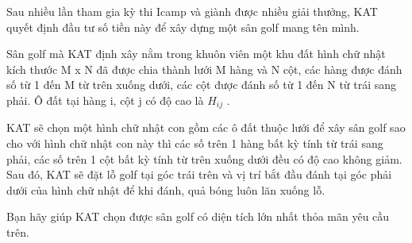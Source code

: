 Sau nhiều lần tham gia kỳ thi Icamp và giành được nhiều giải thưởng, KAT quyết định đầu tư số tiền này để xây dựng một sân golf mang tên mình.

Sân golf mà KAT định xây nằm trong khuôn viên một khu đất hình chữ nhật kích thước M x N đã được chia thành lưới M hàng và N cột, các hàng được đánh số từ 1 đến M từ trên xuống dưới, các cột được đánh số từ 1 đến N từ trái sang phải. Ô đất tại hàng i, cột j có độ cao là $H_{ij}$ .

KAT sẽ chọn một hình chữ nhật con gồm các ô đất thuộc lưới để xây sân golf sao cho với hình chữ nhật con này thì các số trên 1 hàng bất kỳ tính từ trái sang phải, các số trên 1 cột bất kỳ tính từ trên xuống dưới đều có độ cao không giảm. Sau đó, KAT sẽ đặt lỗ golf tại góc trái trên và vị trí bắt đầu đánh tại góc phải dưới của hình chữ nhật để khi đánh, quả bóng luôn lăn xuống lỗ.

Bạn hãy giúp KAT chọn được sân golf có diện tích lớn nhất thỏa mãn yêu cầu trên.